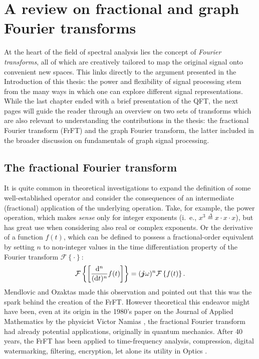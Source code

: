 \chapter{A review on fractional and graph Fourier transforms}
\label{ch:reviewGSP}

At the heart of the field of spectral analysis lies the concept of \textit{Fourier transforms}, all of which are creatively tailored to map the original signal onto convenient new spaces. This links directly to the argument presented in the Introduction of this thesis: the power and flexibility of signal processing stem from the many ways in which one can explore different signal representations. While the last chapter ended with a brief presentation of the QFT, the next pages will guide the reader through an overview on two sets of transforms which are also relevant to understanding the contributions in the thesis: the fractional Fourier transform (FrFT) and the graph Fourier transform, the latter included in the broader discussion on fundamentals of graph signal processing.

\section{The fractional Fourier transform}

It is quite common in theoretical investigations to expand the definition of some well-established operator and consider the consequences of an intermediate (fractional) application of the underlying operation. Take, for example, the power operation, which makes \textit{sense} only for integer exponents (i.~e., $x^3 \overset{\Delta}{=} x \cdot x \cdot x$), but has great use when considering also real or complex exponents. Or the derivative of a function $f(t)$, which can be defined to possess a fractional-order equivalent by setting $n$ to non-integer values in the time differentiation property of the Fourier transform $\mathcal{F} \left\{ \cdot \right\}$:
\begin{equation}
\label{eq:derivative}
\mathcal{F} \left\{ \left[ \frac{\mathrm{d}^n}{(\mathrm{d}t)^n} f(t) \right] \right\} =
(\boldsymbol{j} \omega)^n \mathcal{F} \left\{ f(t) \right\}.
\end{equation}
Mendlovic and Ozaktas made this observation \cite{mendlovic1993fractionalI} and pointed out that this was the spark behind the creation of the FrFT. However theoretical this endeavor might have been, even at its origin in the 1980's paper on the Journal of Applied Mathematics by the physicist Victor Namias \cite{namias1980fractional}, the fractional Fourier transform had already potential applications, originally in quantum mechanics. After 40 years, the FrFT has been applied to time-frequency analysis, compression, digital watermarking, filtering, encryption, let alone its utility in Optics \cite{bultheel2002shattered,figueiredo2018}.

